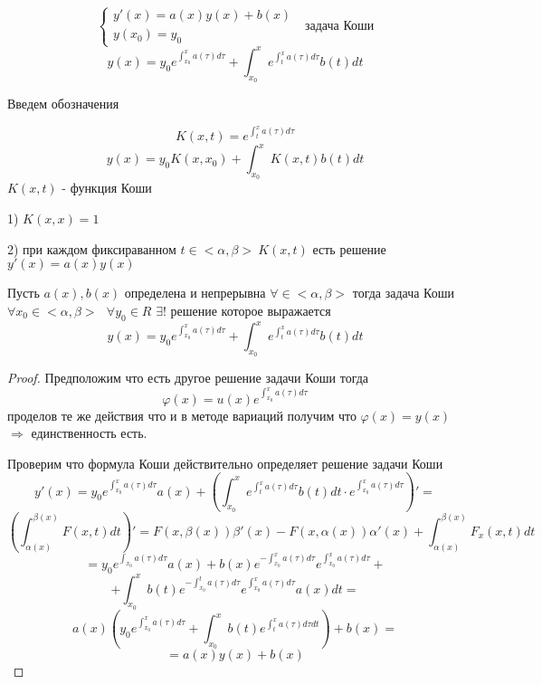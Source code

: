 \begin{block}
  $$
  \left\{
  \begin{array}{l}
    y'(x) = a(x)y(x) + b(x) \\
    y(x_0) = y_0
  \end{array}
  \right. ~~~ \text{задача Коши}
  $$
  $$
  y(x) = y_0 e^{\int_{x_0}^x a(\tau) d\tau} + \int_{x_0}^x
  e^{\int_{t}^x a(\tau) d\tau} b(t)dt
  $$

  Введем обозначения

  $$
  K(x, t) = e^{\int_t^x a(\tau) d\tau}
  $$
  $$
  y(x) = y_0 K(x, x_0) + \int_{x_0}^x K(x, t) b(t) dt
  $$
  $K(x, t)$ - функция Коши
\end{block}

\begin{block}[Свойства]
  1) $K(x, x) = 1$

  2) при каждом фиксираванном $t \in <\alpha, \beta> ~ K(x, t)$ есть решение
  $y'(x) = a(x)y(x)$
\end{block}

\begin{theorem}
  Пусть $a(x), b(x)$ определена и непрерывна $\forall \in <\alpha, \beta>$
  тогда задача Коши $\forall x_0 \in <\alpha, \beta> ~~~ \forall y_0 \in R$
  $\exists !$ решение которое выражается
  $$
  y(x) = y_0 e^{\int_{x_0}^x a(\tau) d\tau} + \int_{x_0}^x
  e^{\int_{t}^x a(\tau) d\tau} b(t)dt
  $$
\end{theorem}

\begin{proof}
  Предположим что есть другое решение задачи Коши тогда
  $$
  \varphi(x) = u(x) e^{\int_{x_0}^x a(\tau)d\tau}
  $$
  проделов те же действия что и в методе вариаций получим что
  $\varphi(x) = y(x)$ $\Rightarrow$ единственность есть.

  Проверим что формула Коши действительно определяет решение задачи Коши
  $$
  y'(x) = y_0 e^{\int_{x_0}^x a(\tau) d\tau} a(x) + \left( \int_{x_0}^x
  e^{\int_{t}^x a(\tau) d\tau} b(t)dt \cdot
  e^{\int_{x_0}^x a(\tau)d\tau} \right)' =
  $$
  $$
  \left( \int_{\alpha(x)}^{\beta(x)} F(x, t) dt \right)' =
  F(x, \beta(x)) \beta'(x) - F(x, \alpha(x)) \alpha'(x) +
  \int_{\alpha(x)}^{\beta(x)} F_x(x, t)dt
  $$
  $$
  = y_0 e^{\int_{x_0} a(\tau)d\tau} a(x) + b(x) e^{-\int_{x_0}^x a(\tau) d\tau}
  e^{\int_{x_0}^x a(\tau) d\tau} +
  $$
  $$
  + \int_{x_0}^x b(t)
  e^{-\int_{x_0}^t a(\tau) d\tau} e^{\int_{x_0}^x a(\tau) d\tau} a(x) dt =
  $$
  $$
  a(x) \left( y_0 e^{\int_{x_0}^x a(\tau) d\tau} + \int_{x_0}^x b(t)
  e^{\int_t^x a(\tau) d\tau dt} \right) + b(x) =
  $$
  $$
  = a(x)y(x) + b(x)
  $$
\end{proof}

